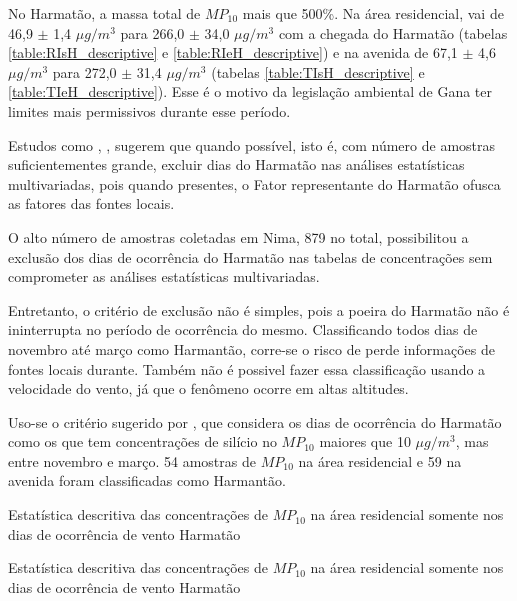 No Harmatão, a massa total de $MP_{10}$ mais que 500\%. Na área residencial, 
vai de 46,9 $\pm$ 1,4 $\mu g / m^3$ para 266,0 $\pm$ 34,0 $\mu g / m^3$
com a chegada do Harmatão (tabelas \ref{table:RIsH_descriptive} 
e \ref{table:RIeH_descriptive}) e na avenida de 67,1 $\pm$ 4,6 $\mu g / m^3$ 
para 272,0 $\pm$ 31,4 $\mu g / m^3$ (tabelas \ref{table:TIsH_descriptive} 
e \ref{table:TIeH_descriptive}). Esse é o motivo da legislação ambiental de Gana
ter limites mais permissivos durante esse período. 

Estudos como \citet{aboh2009}, \citet{ofosu2013}, \citet{ofosu2012} sugerem que
quando possível, isto é, com número de amostras suficientementes grande, excluir
dias do Harmatão nas análises estatísticas multivariadas, pois quando 
presentes, o Fator representante do Harmatão ofusca as fatores das fontes
locais.

O alto número de amostras coletadas em Nima, 879 no total, possibilitou a 
exclusão dos dias de ocorrência do Harmatão nas tabelas de concentrações 
sem comprometer as análises estatísticas multivariadas. 

Entretanto, o critério de exclusão não é simples, pois a poeira do Harmatão 
não é ininterrupta no período de ocorrência do mesmo. Classificando todos dias
de novembro até março como Harmantão, corre-se o risco de perde informações de 
fontes locais durante. Também não é possivel fazer essa classificação usando
a velocidade do vento, já que o fenômeno ocorre em altas altitudes. 

Uso-se o critério sugerido por \citet{aboh2009}, que considera os dias de 
ocorrência do Harmatão como os que tem concentrações de silício no $MP_{10}$ 
maiores que 10 $\mu g/m^3$, mas entre novembro e março. 54 amostras de $MP_{10}$
na área residencial e 59 na avenida foram classificadas como Harmantão. 



\newpage
\begin{table}[H]
  \centering
    
  \caption{Estatística descritiva das concentrações de $MP_{10}$ na área 
           residencial somente nos dias de ocorrência de vento Harmatão
          \label{table:RIeH_descriptive}}
\end{table}

\begin{table}[H]
  \centering
    
  \caption{Estatística descritiva das concentrações de $MP_{10}$ na área 
           residencial somente nos dias de ocorrência de vento Harmatão
           \label{table:TIeH_descriptive}}
\end{table}

